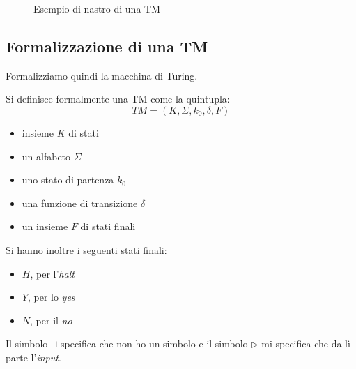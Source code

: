 \begin{figure}
  \centering
  \caption{Esempio di nastro di una TM}
  \label{fig:tur}
\end{figure}
\subsection{Formalizzazione di una TM}
Formalizziamo quindi la macchina di Turing.
\begin{definizione}
  Si definisce formalmente una TM come la quintupla:
  \[TM=(K,\Sigma,k_0, \delta, F)\]
  \begin{itemize}
    \item insieme $K$ di stati
    \item un alfabeto $\Sigma$
    \item uno stato di partenza $k_0$
    \item una funzione di transizione $\delta$
    \item un insieme $F$ di stati finali
  \end{itemize}
  Si hanno inoltre i seguenti stati finali:
  \begin{itemize}
    \item $H$, per l'\textit{halt}
    \item $Y$, per lo \textit{yes}
    \item $N$, per il \textit{no}
  \end{itemize}
  Il simbolo $\sqcup$ specifica che non ho un simbolo e il simbolo
  $\triangleright$ mi specifica che da lì parte l'\textit{input}.
\end{definizione}
